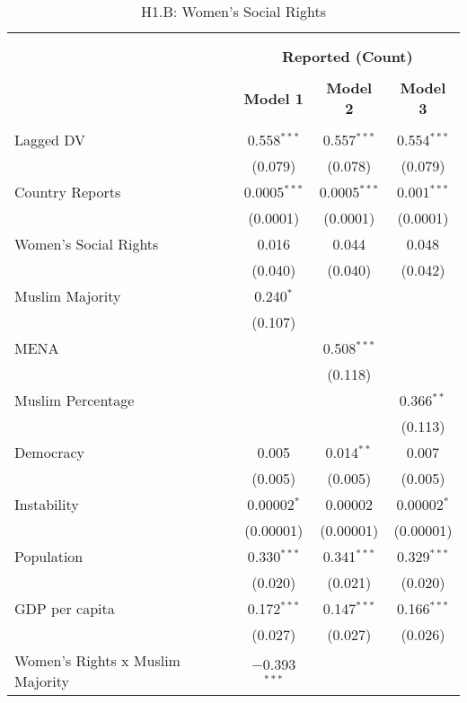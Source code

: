 
\begin{table}[!htbp] \centering 
  \caption{H1.B: Women's Social Rights} 
  \label{} 
\begin{tabular}{@{\extracolsep{5pt}}lccc} 
\\[-1.8ex]\hline \\[-1.8ex] 
\\[-1.8ex] & \multicolumn{3}{c}{\textbf{Reported (Count)}} \\ 
\\[-1.8ex] & \textbf{Model 1} & \textbf{Model 2} & \textbf{Model 3}\\ 
\hline \\[-1.8ex] 
 Lagged DV & 0.558$^{***}$ & 0.557$^{***}$ & 0.554$^{***}$ \\ 
  & (0.079) & (0.078) & (0.079) \\ 
  Country Reports & 0.0005$^{***}$ & 0.0005$^{***}$ & 0.001$^{***}$ \\ 
  & (0.0001) & (0.0001) & (0.0001) \\ 
  Women's Social Rights & 0.016 & 0.044 & 0.048 \\ 
  & (0.040) & (0.040) & (0.042) \\ 
  Muslim Majority & 0.240$^{*}$ &  &  \\ 
  & (0.107) &  &  \\ 
  MENA &  & 0.508$^{***}$ &  \\ 
  &  & (0.118) &  \\ 
  Muslim Percentage &  &  & 0.366$^{**}$ \\ 
  &  &  & (0.113) \\ 
  Democracy & 0.005 & 0.014$^{**}$ & 0.007 \\ 
  & (0.005) & (0.005) & (0.005) \\ 
  Instability & 0.00002$^{*}$ & 0.00002 & 0.00002$^{*}$ \\ 
  & (0.00001) & (0.00001) & (0.00001) \\ 
  Population & 0.330$^{***}$ & 0.341$^{***}$ & 0.329$^{***}$ \\ 
  & (0.020) & (0.021) & (0.020) \\ 
  GDP per capita & 0.172$^{***}$ & 0.147$^{***}$ & 0.166$^{***}$ \\ 
  & (0.027) & (0.027) & (0.026) \\ 
  Women's Rights x Muslim Majority & $-$0.393$^{***}$ &  &  \\ 

\end{tabular}
\end{table}
